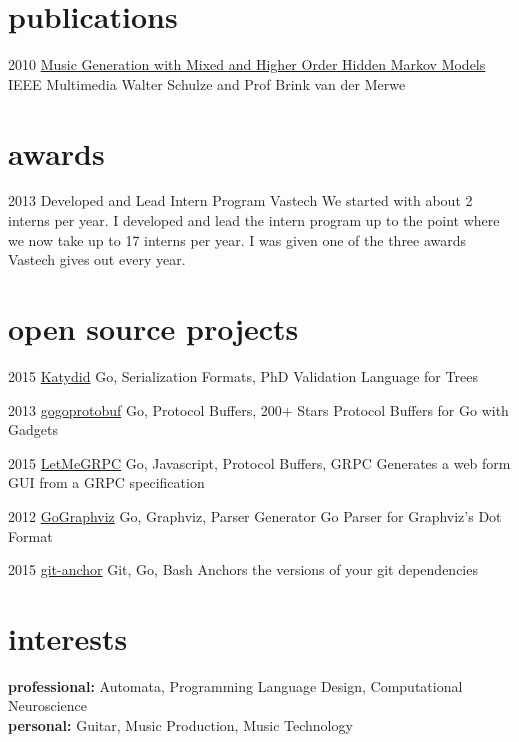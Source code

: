 \documentclass[]{friggeri-cv} %
\begin{document}
\section{publications}


\begin{entrylist}

\entry
{2010}
{\href{http://doi.ieeecomputersociety.org/10.1109/MMUL.2010.44}{Music Generation with Mixed and Higher Order Hidden Markov Models}}
{IEEE Multimedia}
{Walter Schulze and Prof Brink van der Merwe}

\end{entrylist}

\section{awards}

\begin{entrylist}

\entry
{2013}
{Developed and Lead Intern Program}
{Vastech}
{We started with about 2 interns per year. I developed and lead the intern program up to the point where we now take up to 17 interns per year.  I was given one of the three awards Vastech gives out every year.}

\end{entrylist}

\section{open source projects}


\begin{entrylist}

\entry
{2015}
{\href{https://github.com/katydid/katydid}{Katydid}}
{Go, Serialization Formats, PhD}
{Validation Language for Trees}

\entry
{2013}
{\href{https://github.com/gogo/protobuf}{gogoprotobuf}}
{Go, Protocol Buffers, 200+ Stars}
{Protocol Buffers for Go with Gadgets}

\entry
{2015}
{\href{https://github.com/gogo/letmegrpc}{LetMeGRPC}}
{Go, Javascript, Protocol Buffers, GRPC}
{Generates a web form GUI from a GRPC specification}

\entry
{2012}
{\href{https://github.com/awalterschulze/gographviz}{GoGraphviz}}
{Go, Graphviz, Parser Generator}
{Go Parser for Graphviz's Dot Format}

\entry
{2015}
{\href{https://github.com/awalterschulze/git-anchor}{git-anchor}}
{Git, Go, Bash}
{Anchors the versions of your git dependencies}

\end{entrylist}

\section{interests}

\textbf{professional:} Automata, Programming Language Design, Computational Neuroscience \\
\textbf{personal:} Guitar, Music Production, Music Technology
\end{document}
